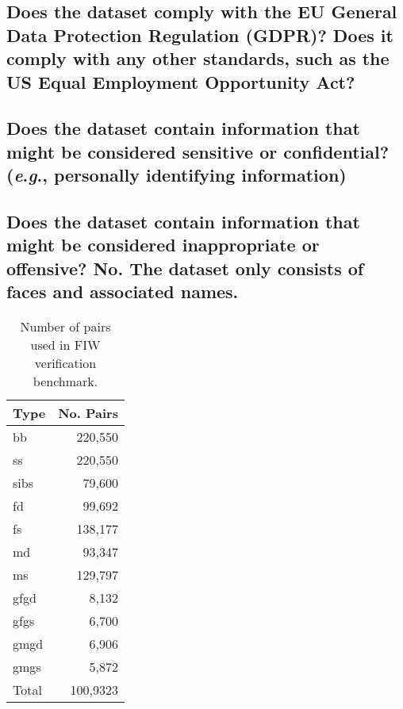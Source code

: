 \documentclass[a4paper,9pt]{extarticle}
\newcommand{\eg}{\textit{e}.\textit{g}., }
\begin{document}
\begin{multicols}{2}
\subsection*{Does the dataset comply with the EU General Data Protection Regulation (GDPR)? Does it comply with any other standards, such as the US Equal Employment Opportunity Act?}
\noindent

\subsection*{Does the dataset contain information that might be considered sensitive or confidential? (\eg personally identifying information)}
\noindent

\subsection*{Does the dataset contain information that might be considered inappropriate or offensive?
No. The dataset only consists of faces and associated names.}
\noindent
\end{multicols}

\begin{table}[t!]
    \centering
    \caption{Number of pairs used in FIW verification benchmark.}\label{tab:my_label}
    \begin{tabular}{lr}
    
        \toprule
        \textbf{Type} &      \textbf{No. Pairs}   \\
        \midrule
        bb   &  220,550 \\
        ss   &  220,550 \\
        sibs &   79,600 \\
        \hline
        fd   &   99,692 \\
        fs   &  138,177 \\
        md   &   93,347 \\
        ms   &  129,797 \\
       \hline
        gfgd &    8,132 \\
        gfgs &    6,700 \\
        gmgd &    6,906 \\
        gmgs &    5,872 \\
        \midrule
        Total   &  100,9323 \\
        \bottomrule
    \end{tabular}
\end{table}
\end{document}
